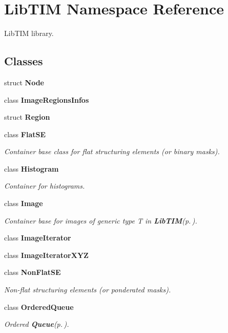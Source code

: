 \section{Lib\-TIM Namespace Reference}
\label{namespaceLibTIM}
Lib\-TIM library.  


\subsection*{Classes}
\begin{CompactItemize}
\item 
struct {\bf Node}
\item 
class {\bf Image\-Regions\-Infos}
\item 
struct {\bf Region}
\item 
class {\bf Flat\-SE}
\begin{CompactList}\small\item\em Container base class for flat structuring elements (or binary masks). \item\end{CompactList}\item 
class {\bf Histogram}
\begin{CompactList}\small\item\em Container for histograms. \item\end{CompactList}\item 
class {\bf Image}
\begin{CompactList}\small\item\em Container base for images of generic type T in {\bf Lib\-TIM}{\rm (p.\,\pageref{namespaceLibTIM})}. \item\end{CompactList}\item 
class {\bf Image\-Iterator}
\item 
class {\bf Image\-Iterator\-XYZ}
\item 
class {\bf Non\-Flat\-SE}
\begin{CompactList}\small\item\em Non-flat structuring elements (or ponderated masks). \item\end{CompactList}\item 
class {\bf Ordered\-Queue}
\begin{CompactList}\small\item\em Ordered {\bf Queue}{\rm (p.\,\pageref{classLibTIM_1_1Queue})}. \item\end{CompactList}\item 

\end{CompactItemize}
